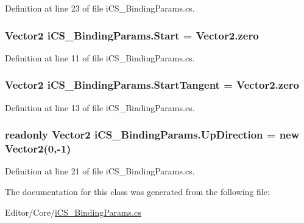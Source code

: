 Definition at line 23 of file i\+C\+S\+\_\+\+Binding\+Params.\+cs.

\hypertarget{classi_c_s___binding_params_af5f5d4614da797cf504d6e055533661b}{
\subsubsection[{Start}]{\setlength{\rightskip}{0pt plus 5cm}Vector2 i\+C\+S\+\_\+\+Binding\+Params.\+Start = Vector2.\+zero}}\label{classi_c_s___binding_params_af5f5d4614da797cf504d6e055533661b}


Definition at line 11 of file i\+C\+S\+\_\+\+Binding\+Params.\+cs.

\hypertarget{classi_c_s___binding_params_ace424b62e2696361c73710aa71580aaf}{
\subsubsection[{Start\+Tangent}]{\setlength{\rightskip}{0pt plus 5cm}Vector2 i\+C\+S\+\_\+\+Binding\+Params.\+Start\+Tangent = Vector2.\+zero}}\label{classi_c_s___binding_params_ace424b62e2696361c73710aa71580aaf}


Definition at line 13 of file i\+C\+S\+\_\+\+Binding\+Params.\+cs.

\hypertarget{classi_c_s___binding_params_a2d3bd58f85f2b0663e6c19b454ec63ca}{
\subsubsection[{Up\+Direction}]{\setlength{\rightskip}{0pt plus 5cm}readonly Vector2 i\+C\+S\+\_\+\+Binding\+Params.\+Up\+Direction = new Vector2(0,-\/1)\hspace{0.3cm}{\ttfamily [static]}}}\label{classi_c_s___binding_params_a2d3bd58f85f2b0663e6c19b454ec63ca}


Definition at line 21 of file i\+C\+S\+\_\+\+Binding\+Params.\+cs.



The documentation for this class was generated from the following file\+:\begin{DoxyCompactItemize}
\item 
Editor/\+Core/\hyperlink{i_c_s___binding_params_8cs}{i\+C\+S\+\_\+\+Binding\+Params.\+cs}\end{DoxyCompactItemize}
